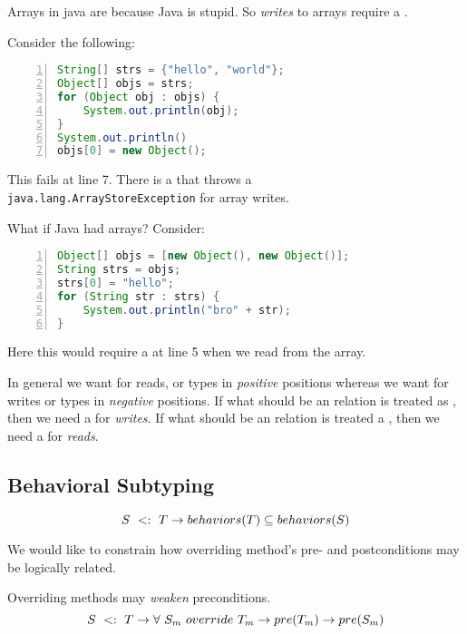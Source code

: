 \documentclass{article}
\begin{document}
Arrays in java are \covar{} because Java is stupid. So \textit{writes} to arrays require a \runtimecheck{}.

\begin{example}
Consider the following:
\begin{lstlisting}[language=Java, numbers=left]
String[] strs = {"hello", "world"};
Object[] objs = strs;
for (Object obj : objs) {
    System.out.println(obj);
}
System.out.println()
objs[0] = new Object();
\end{lstlisting}
This fails at line 7. There is a \runtimecheck{} that throws a \\ \texttt{java.lang.ArrayStoreException} for array writes.
\end{example}

\begin{example}
What if Java had \contra{} arrays? Consider:
\begin{lstlisting}[language=Java, numbers=left]
Object[] objs = [new Object(), new Object()];
String strs = objs;
strs[0] = "hello";
for (String str : strs) {
    System.out.println("bro" + str);
}
\end{lstlisting}
Here this would require a \runtimecheck{} at line 5 when we read from the array.
\end{example}

In general we want \covar{} for reads, or types in \textit{positive} positions whereas we want \contra{} for writes or types in \textit{negative} positions.
If what should be an \invar{} relation is treated as \covar{}, then we need a \runtimecheck{} for \textit{writes}.
If what should be an \invar{} relation is treated a \contra{}, then we need a \runtimecheck{} for \textit{reads}.

\subsection{Behavioral Subtyping}

\begin{definition}
\begin{equation}
    S ~ <: ~ T \rightarrow behaviors(T) \subseteq behaviors(S)
\end{equation} 
\end{definition}

We would like to constrain how overriding method's pre- and postconditions may be logically related.

\begin{definition}
Overriding methods may \textit{weaken} preconditions.
\begin{equation}
S ~ <: ~ T \rightarrow \forall ~ S_m ~ override{} ~ T_m \rightarrow pre(T_m) \rightarrow pre(S_m)
\end{equation}
\end{definition}
\end{document}
